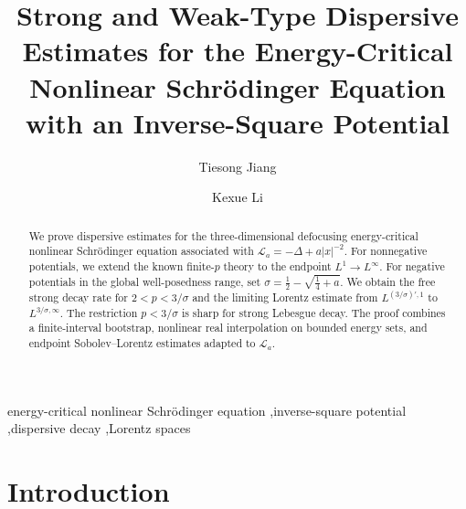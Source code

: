 \documentclass[preprint,12pt]{elsarticle}
\numberwithin{equation}{section}
\theoremstyle{definition}
\theoremstyle{remark}
\begin{document}
\begin{frontmatter}

\title{Strong and Weak-Type Dispersive Estimates for the Energy-Critical Nonlinear Schrödinger Equation with an Inverse-Square Potential}


\author[]{Tiesong Jiang}

\author[]{Kexue Li}





\begin{abstract}
We prove dispersive estimates for the three-dimensional defocusing energy-critical nonlinear Schr\"odinger equation associated with $\mathcal L_a=-\Delta+a|x|^{-2}$. For nonnegative potentials, we extend the known finite-$p$ theory to the endpoint $L^1\to L^\infty$. For negative potentials in the global well-posedness range, set $\sigma=\frac12-\sqrt{\frac14+a}$. We obtain the free strong decay rate for $2<p<3/\sigma$ and the limiting Lorentz estimate from $L^{(3/\sigma)',1}$ to $L^{3/\sigma,\infty}$. The restriction $p<3/\sigma$ is sharp for strong Lebesgue decay. The proof combines a finite-interval bootstrap, nonlinear real interpolation on bounded energy sets, and endpoint Sobolev--Lorentz estimates adapted to $\mathcal L_a$.
\end{abstract}

\begin{keyword}
energy-critical nonlinear Schr\"odinger equation \sep inverse-square potential \sep dispersive decay \sep Lorentz spaces 
\end{keyword}

\end{frontmatter}

\section{Introduction}
\end{document}
